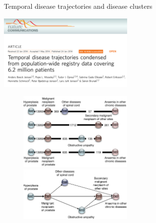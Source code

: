 \documentclass[ignorenonframetext,]{beamer}
\begin{document}
\begin{frame}{Temporal disease trajectories and disease clusters}

\includegraphics[keepaspectratio,width=0.5\textwidth]{images/trajectories.png}

\begin{figure}[t!]
  \includegraphics[keepaspectratio,width=0.5\textwidth]{images/ncomms5022-f11.png}
  \includegraphics[keepaspectratio,width=0.5\textwidth]{images/ncomms5022-f12.png}
\end{figure}

\end{frame}
\end{document}
